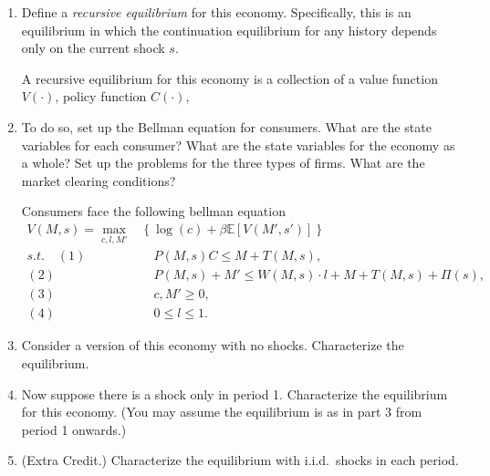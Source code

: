 \documentclass[11pt,english]{article}
\begin{document}
\begin{enumerate}
    \item Define a \textit{recursive equilibrium} for this economy. Specifically,
        this is an equilibrium in which the continuation equilibrium for any
        history depends only on the current shock $s$.
     \begin{solution}
 A recursive equilibrium for this economy is a collection of a value function $V(\cdot)$, policy function $C(\cdot)$, 
    \end{solution}
    \item To do so, set up the Bellman equation for consumers. What are the
        state variables for each consumer? What are the state variables for the
        economy as a whole? Set up the problems for the three types of firms.
        What are the market clearing conditions?
    \begin{solution}
 Consumers face the following bellman equation
\begin{align*}
V(M, s) = \max_{c, l, M'}&\left\{\log(c) + \beta \mathbb{E}[V(M', s')]\right\}\\
s.t.\quad (1)&\quad P(M, s)C \leq M + T(M, s),\\
(2)&\quad P(M,s) + M' \leq W(M,s)\cdot l + M + T(M,s) + \Pi(s),\\
(3)&\quad c, M'\geq 0,\\
(4)&\quad 0 \leq l \leq 1.
\end{align*}
    \end{solution}
 
    \item Consider a version of this economy with no shocks. Characterize the
        equilibrium.
    \begin{solution}
 
    \end{solution}
 
    \item Now suppose there is a shock only in period 1. Characterize the
        equilibrium for this economy. (You may assume the equilibrium is as in
        part 3 from period 1 onwards.)
    \begin{solution}
 
    \end{solution}
 
    \item (Extra Credit.) Characterize the equilibrium with i.i.d.\ shocks in
        each period.
    \begin{solution}
 
    \end{solution}
\end{enumerate}
\end{document}
